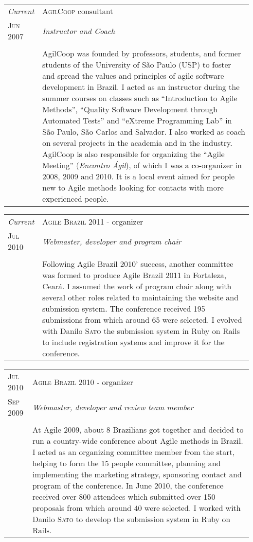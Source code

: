 \documentclass[letter,10pt]{article}
\begin{document}
\begin{tabular}{p{2.5cm}|p{13.5cm}}
  \emph{Current} & \textsc{AgilCoop} consultant\\
  \textsc{Jun 2007}& \emph{Instructor and Coach}\\
  &\\
  &AgilCoop was founded by professors,
  students, and former students of the University of São Paulo (USP)
  to foster and spread the values and principles of agile software
  development in Brazil. I acted as an instructor during the summer
  courses on classes such as ``Introduction to Agile Methods'',
  ``Quality Software Development through Automated Tests'' and
  ``eXtreme Programming Lab'' in São Paulo, São Carlos and Salvador.
  I also worked as coach on several projects in the academia
  and in the industry. AgilCoop is also responsible for organizing
  the ``Agile Meeting'' (\emph{Encontro Ágil}), of which I was a
  co-organizer in 2008, 2009 and 2010. It is a local
  event aimed for people new to Agile methods looking for contacts
  with more experienced people.
\end{tabular}

\begin{tabular}{p{2.5cm}|p{13.5cm}}
  \emph{Current} & \textsc{Agile Brazil 2011} - organizer\\
  \textsc{Jul 2010}& \emph{Webmaster, developer and program chair}\\
  &\\
  & Following Agile Brazil 2010' success, another committee was formed
  to produce Agile Brazil 2011 in Fortaleza, Ceará. I assumed the work
  of program chair along with several other roles related to
  maintaining the website and submission system. The conference
  received 195 submissions from which around 65 were selected. I
  evolved with Danilo \textsc{Sato} the submission system in Ruby on
  Rails to include registration systems and improve it for the conference.
\end{tabular}

\begin{tabular}{p{2.5cm}|p{13.5cm}}
  \textsc{Jul 2010} & \textsc{Agile Brazil 2010} - organizer\\
  \textsc{Sep 2009}& \emph{Webmaster, developer and review team
    member}\\
  &\\
  &At Agile 2009, about 8 Brazilians got together and
  decided to run a country-wide conference about Agile methods in
  Brazil. I acted as an organizing committee member from the start, helping to form the
  15 people committee, planning and implementing the marketing
  strategy, sponsoring contact and program of the conference. In
  June 2010, the conference received over 800 attendees which
  submitted over 150 proposals from which around 40 were selected. I
  worked with Danilo \textsc{Sato} to develop the submission system in Ruby on
  Rails.
\end{tabular}
\end{document}
